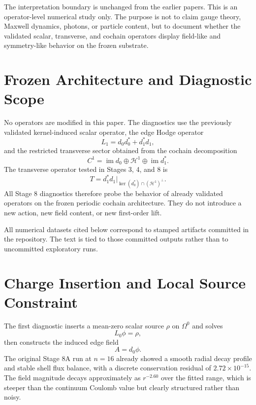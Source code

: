 \documentclass[11pt]{article}
\begin{document}
The interpretation boundary is unchanged from the earlier papers. This is an operator-level numerical study only. The purpose is not to claim gauge theory, Maxwell dynamics, photons, or particle content, but to document whether the validated scalar, transverse, and cochain operators display field-like and symmetry-like behavior on the frozen substrate.

\section{Frozen Architecture and Diagnostic Scope}
No operators are modified in this paper. The diagnostics use the previously validated kernel-induced scalar operator, the edge Hodge operator
\begin{equation}
L_1 = d_0 d_0^{*} + d_1^{*} d_1,
\end{equation}
and the restricted transverse sector obtained from the cochain decomposition
\begin{equation}
C^1 = \operatorname{im} d_0 \oplus \mathcal{H}^1 \oplus \operatorname{im} d_1^{*}.
\end{equation}
The transverse operator tested in Stages 3, 4, and 8 is
\begin{equation}
T = d_1^{*} d_1\big|_{\ker(d_0^{*}) \cap (\mathcal{H}^1)^\perp}.
\end{equation}
All Stage 8 diagnostics therefore probe the behavior of already validated operators on the frozen periodic cochain architecture. They do not introduce a new action, new field content, or new first-order lift.

All numerical datasets cited below correspond to stamped artifacts committed in the repository. The text is tied to those committed outputs rather than to uncommitted exploratory runs.

\section{Charge Insertion and Local Source Constraint}
The first diagnostic inserts a mean-zero scalar source $\rho$ on $\Omega^0$ and solves
\begin{equation}
L_0 \phi = \rho,
\end{equation}
then constructs the induced edge field
\begin{equation}
A = d_0 \phi.
\end{equation}
The original Stage 8A run at $n=16$ already showed a smooth radial decay profile and stable shell flux balance, with a discrete conservation residual of $2.72 \times 10^{-15}$. The field magnitude decays approximately as $r^{-2.60}$ over the fitted range, which is steeper than the continuum Coulomb value but clearly structured rather than noisy.
\end{document}
